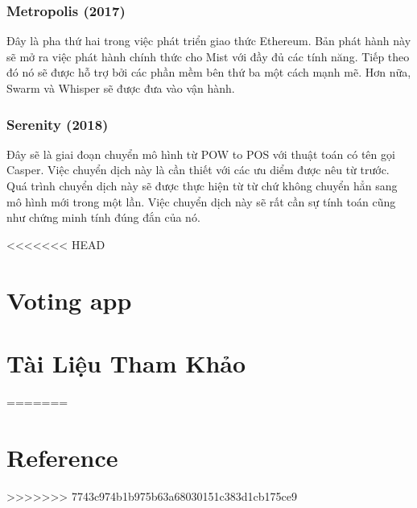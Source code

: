 \documentclass[12pt]{article}
\begin{document}
	\subsubsection{Metropolis (2017)}
	Đây là pha thứ hai trong việc phát triển giao thức Ethereum. Bản phát hành này sẽ mở ra việc phát hành chính thức cho Mist với đầy đủ các tính năng. Tiếp theo đó nó sẽ được hỗ trợ bởi các phần mềm bên thứ ba một cách mạnh mẽ. Hơn nữa, Swarm và Whisper sẽ được đưa vào vận hành.

	\subsubsection{Serenity (2018)}
	Đây sẽ là giai đoạn chuyển mô hình từ POW to POS với thuật toán có tên gọi Casper. Việc chuyển dịch này là cần thiết với các ưu diểm được nêu từ trước. Quá trình chuyển dịch này sẽ được thực hiện từ từ chứ không chuyển hẳn sang mô hình mới trong một lần. Việc chuyển dịch này sẽ rất cần sự tính toán cũng như chứng minh tính đúng đắn của nó.
	
<<<<<<< HEAD
	\section{Voting app}
	
	\section{Tài Liệu Tham Khảo}
=======
	\section{Reference}
>>>>>>> 7743c974b1b975b63a68030151c383d1cb175ce9
	
\end{document}
